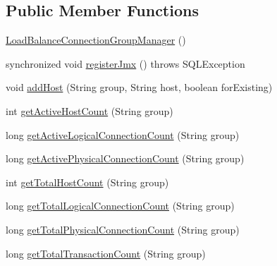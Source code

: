 \subsection*{Public Member Functions}
\begin{DoxyCompactItemize}
\item 
\mbox{\hyperlink{classcom_1_1mysql_1_1cj_1_1jdbc_1_1jmx_1_1_load_balance_connection_group_manager_aa6f5f267bc23e9ab0fd244dec525570a}{Load\+Balance\+Connection\+Group\+Manager}} ()
\item 
synchronized void \mbox{\hyperlink{classcom_1_1mysql_1_1cj_1_1jdbc_1_1jmx_1_1_load_balance_connection_group_manager_a86928f09a18d9634d280a8057ac5123e}{register\+Jmx}} ()  throws S\+Q\+L\+Exception 
\item 
void \mbox{\hyperlink{classcom_1_1mysql_1_1cj_1_1jdbc_1_1jmx_1_1_load_balance_connection_group_manager_a5fce59adea0a812670b665f48d90a6b2}{add\+Host}} (String group, String host, boolean for\+Existing)
\item 
int \mbox{\hyperlink{classcom_1_1mysql_1_1cj_1_1jdbc_1_1jmx_1_1_load_balance_connection_group_manager_ad1adadfdbdc920e319033d8e2ae33402}{get\+Active\+Host\+Count}} (String group)
\item 
long \mbox{\hyperlink{classcom_1_1mysql_1_1cj_1_1jdbc_1_1jmx_1_1_load_balance_connection_group_manager_a9875273d77d365e2e961d26214d220fd}{get\+Active\+Logical\+Connection\+Count}} (String group)
\item 
long \mbox{\hyperlink{classcom_1_1mysql_1_1cj_1_1jdbc_1_1jmx_1_1_load_balance_connection_group_manager_a386e3fbaa0dad1f3b0ca889a51bb8c4f}{get\+Active\+Physical\+Connection\+Count}} (String group)
\item 
int \mbox{\hyperlink{classcom_1_1mysql_1_1cj_1_1jdbc_1_1jmx_1_1_load_balance_connection_group_manager_a90c2109fd7e75a706b5bc8fd40849f36}{get\+Total\+Host\+Count}} (String group)
\item 
long \mbox{\hyperlink{classcom_1_1mysql_1_1cj_1_1jdbc_1_1jmx_1_1_load_balance_connection_group_manager_a401a62077f4163b3b3f24afa6b87d4ce}{get\+Total\+Logical\+Connection\+Count}} (String group)
\item 
long \mbox{\hyperlink{classcom_1_1mysql_1_1cj_1_1jdbc_1_1jmx_1_1_load_balance_connection_group_manager_a45d77c665ec07e20991eb00c9723d850}{get\+Total\+Physical\+Connection\+Count}} (String group)
\item 
long \mbox{\hyperlink{classcom_1_1mysql_1_1cj_1_1jdbc_1_1jmx_1_1_load_balance_connection_group_manager_a326883b94b5b7d63d55dbfd1db697d6d}{get\+Total\+Transaction\+Count}} (String group)

\end{DoxyCompactItemize}
